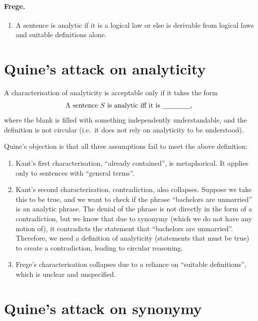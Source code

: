 \paragraph{Frege.}
\begin{enumerate}
  \item A sentence is analytic if it is a logical law or else is derivable from logical laws and suitable definitions alone.
\end{enumerate}

\section{Quine's attack on analyticity}

\begin{definition}
A characterisation of analyticity is acceptable only if it takes the form
\[
  \text{A sentence $S$ is analytic iff it is \underline{\hspace{4em}}},
\]
where the blank is filled with something independently understandable, and the definition is not circular (i.e.\ it does not rely on analyticity to be understood).
\end{definition}

Quine's objection is that all three assumptions fail to meet the above definition:
\begin{enumerate}[label=(\alph*)]
  \item Kant's first characterisation, ``already contained'', is metaphorical. It applies only to sentences with ``general terms''.
  \item Kant's second characterisation, contradiction, also collapses. Suppose we take this to be true, and we want to check if the phrase ``bachelors are unmarried'' is an analytic phrase. The denial of the phrase is not directly in the form of a contradiction, but we know that due to synonymy (which we do not have any notion of), it contradicts the statement that ``bachelors are unmarried''. Therefore, we need a definition of analyticity (statements that must be true) to create a contradiction, leading to circular reasoning.
  \item Frege's characterisation collapses due to a reliance on ``suitable definitions'', which is unclear and unspecified.
\end{enumerate}

\section{Quine's attack on synonymy}

